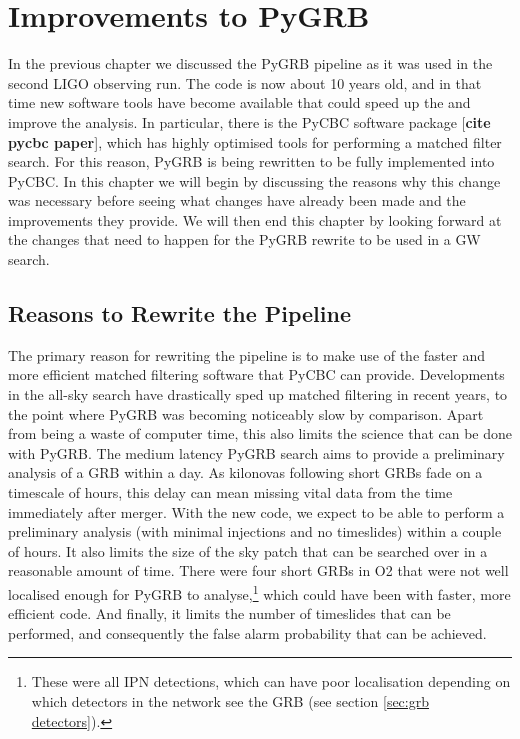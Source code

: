 \documentclass[11pt]{cuthesis}
\begin{document}
\chapter{Improvements to PyGRB} \label{sec:pygrb improvements}
In the previous chapter we discussed the PyGRB pipeline as it was used in the second LIGO observing run. The code is now about 10 years old, and in that time new software tools have become available that could speed up the and improve the analysis. In particular, there is the PyCBC software package [\textbf{cite pycbc paper}], which has highly optimised tools for performing a matched filter search. For this reason, PyGRB is being rewritten to be fully implemented into PyCBC. In this chapter we will begin by discussing the reasons why this change was necessary before seeing what changes have already been made and the improvements they provide. We will then end this chapter by looking forward at the changes that need to happen for the PyGRB rewrite to be used in a GW search.


\section{Reasons to Rewrite the Pipeline}
The primary reason for rewriting the pipeline is to make use of the faster and more efficient matched filtering software that PyCBC can provide. Developments in the all-sky search have drastically sped up matched filtering in recent years, to the point where PyGRB was becoming noticeably slow by comparison. Apart from being a waste of computer time, this also limits the science that can be done with PyGRB. The medium latency PyGRB search aims to provide a preliminary analysis of a GRB within a day. As kilonovas following short GRBs fade on a timescale of hours, this delay can mean missing vital data from the time immediately after merger. With the new code, we expect to be able to perform a preliminary analysis (with minimal injections and no timeslides) within a couple of hours. It also limits the size of the sky patch that can be searched over in a reasonable amount of time. There were four short GRBs in O2 that were not well localised enough for PyGRB to analyse,\footnote{These were all IPN detections, which can have poor localisation depending on which detectors in the network see the GRB (see section \ref{sec:grb detectors}).} which could have been with faster, more efficient code. And finally, it limits the number of timeslides that can be performed, and consequently the false alarm probability that can be achieved. 
\end{document}
